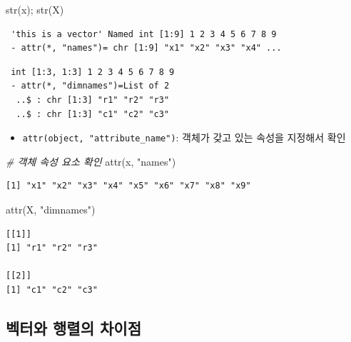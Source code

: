 \documentclass[
  11pt,
]{krantz}
\newenvironment{Shaded}{\begin{snugshade}}{\end{snugshade}}
\newcommand{\CommentTok}[1]{\textcolor[rgb]{0.37,0.37,0.37}{\textit{#1}}}
\newcommand{\FunctionTok}[1]{\textcolor[rgb]{0,0,0}{#1}}
\newcommand{\NormalTok}[1]{#1}
\newcommand{\StringTok}[1]{\textcolor[rgb]{0.5,0.5,0.5}{#1}}
\providecommand{\tightlist}{%
  \setlength{\itemsep}{0pt}\setlength{\parskip}{0pt}}
\begin{document}
\begin{Shaded}
\begin{Highlighting}[]
\FunctionTok{str}\NormalTok{(x); }\FunctionTok{str}\NormalTok{(X)}
\end{Highlighting}
\end{Shaded}

\begin{verbatim}
 'this is a vector' Named int [1:9] 1 2 3 4 5 6 7 8 9
 - attr(*, "names")= chr [1:9] "x1" "x2" "x3" "x4" ...
\end{verbatim}

\begin{verbatim}
 int [1:3, 1:3] 1 2 3 4 5 6 7 8 9
 - attr(*, "dimnames")=List of 2
  ..$ : chr [1:3] "r1" "r2" "r3"
  ..$ : chr [1:3] "c1" "c2" "c3"
\end{verbatim}

\normalsize

\begin{itemize}
\tightlist
\item
  \texttt{attr(object,\ "attribute\_name")}: 객체가 갖고 있는 속성을 지정해서 확인
\end{itemize}

\footnotesize

\begin{Shaded}
\begin{Highlighting}[]
\CommentTok{\# 객체 속성 요소 확인}
\FunctionTok{attr}\NormalTok{(x, }\StringTok{"names"}\NormalTok{)}
\end{Highlighting}
\end{Shaded}

\begin{verbatim}
[1] "x1" "x2" "x3" "x4" "x5" "x6" "x7" "x8" "x9"
\end{verbatim}

\begin{Shaded}
\begin{Highlighting}[]
\FunctionTok{attr}\NormalTok{(X, }\StringTok{"dimnames"}\NormalTok{)}
\end{Highlighting}
\end{Shaded}

\begin{verbatim}
[[1]]
[1] "r1" "r2" "r3"

[[2]]
[1] "c1" "c2" "c3"
\end{verbatim}

\normalsize

\hypertarget{vec-mat-diff}{%
\subsection{벡터와 행렬의 차이점}\label{vec-mat-diff}}
\end{document}
